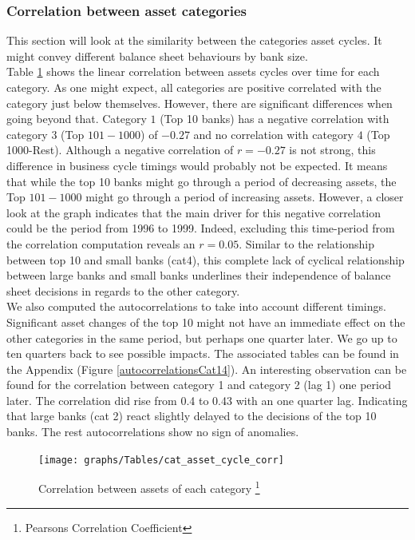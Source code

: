 \documentclass[12pt, a4paper]{article} %
\begin{document}
\subsubsection{Correlation between asset categories}
This section will look at the similarity between the categories asset cycles. It might convey different balance sheet behaviours by bank size.\\ 
Table \ref{table:cat_assets_corr} shows the linear correlation between assets cycles over time for each category. As one might expect, all categories are positive correlated with the category just below themselves. However, there are significant differences when going beyond that. Category $1$ (Top 10 banks) has a negative correlation with category $3$ (Top $101-1000$) of $-0.27$ and no correlation with category $4$ (Top 1000-Rest). Although a negative correlation of $r=-0.27$ is not strong, this difference in business cycle timings would probably not be expected. It means that while the top 10 banks might go through a period of decreasing assets, the Top $101-1000$ might go through a period of increasing assets. However, a closer look at the graph indicates that the main driver for this negative correlation could be the period from 1996 to 1999. Indeed, excluding this time-period from the correlation computation reveals an $r=0.05$. Similar to the relationship between top 10 and small banks (cat4), this complete lack of cyclical relationship between large banks and small banks underlines their independence of balance sheet decisions in regards to the other category.\\
We also computed the autocorrelations to take into account different timings. Significant asset changes of the top 10 might not have an immediate effect on the other categories in the same period, but perhaps one quarter later. We go up to ten quarters back to see possible impacts. The associated tables can be found in the Appendix (Figure \ref{autocorrelationsCat14}). An interesting observation can be found for the correlation between category 1 and category 2 (lag 1) one period later. The correlation did rise from 0.4 to 0.43 with an one quarter lag. Indicating that large banks (cat 2) react slightly delayed to the decisions of the top 10 banks. The rest autocorrelations show no sign of anomalies.



\begin{figure}[H]
\begin{minipage}{\textwidth}
\centering
\caption[1]{Correlation between assets of each category \footnote{Pearsons Correlation Coefficient} }
\texttt{[image: graphs/Tables/cat\_asset\_cycle\_corr]}
\label{table:cat_assets_corr}
\end{minipage}
\end{figure} 
\end{document}
